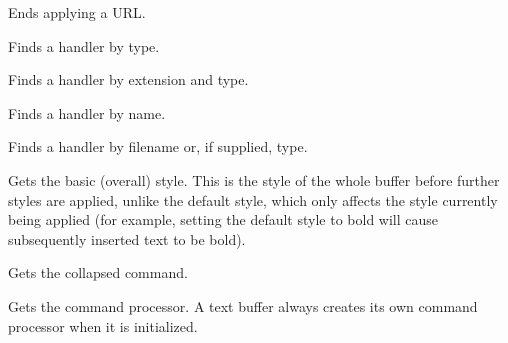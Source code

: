 
Ends applying a URL.

\label{wxrichtextbufferfindhandler}


Finds a handler by type.


Finds a handler by extension and type.


Finds a handler by name.

\label{wxrichtextbufferfindhandlerfilenameortype}


Finds a handler by filename or, if supplied, type.

\label{wxrichtextbuffergetbasicstyle}


Gets the basic (overall) style. This is the style of the whole
buffer before further styles are applied, unlike the default style, which
only affects the style currently being applied (for example, setting the default
style to bold will cause subsequently inserted text to be bold).

\label{wxrichtextbuffergetbatchedcommand}


Gets the collapsed command.

\label{wxrichtextbuffergetcommandprocessor}


Gets the command processor. A text buffer always creates its own command processor when it is
initialized.

\label{wxrichtextbuffergetdefaultstyle}

